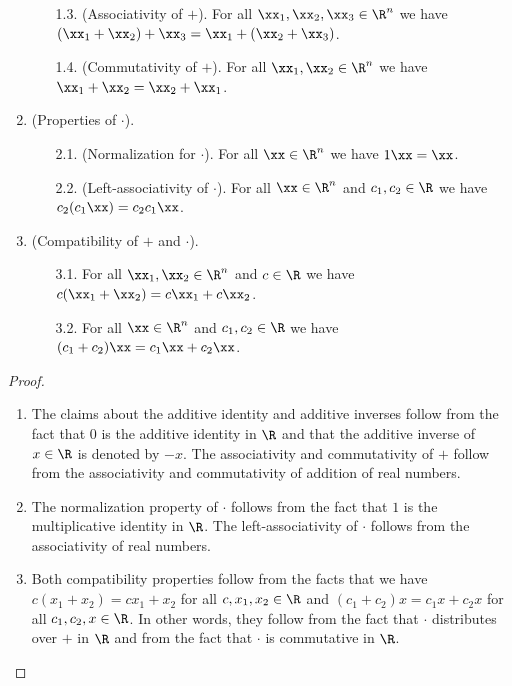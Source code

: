 \begin{theorem}
\begin{enumerate}
\begin{enumerate}
                \item[1.3.] (Associativity of $+$). For all $\xx_1, \xx_2, \xx_3 \in \R^n$ we have $(\xx_1 + \xx_2) + \xx_3 = \xx_1 + (\xx_2 + \xx_3)$.
                \item[1.4.] (Commutativity of $+$). For all $\xx_1, \xx_2 \in \R^n$ we have $\xx_1 + \xx_2 = \xx_2 + \xx_1$.
            \end{enumerate}
            \item (Properties of $\cdot$).
            \begin{enumerate}
                \item[2.1.] (Normalization for $\cdot$). For all $\xx \in \R^n$ we have $1 \xx = \xx$.
                \item[2.2.] (Left-associativity of $\cdot$). For all $\xx \in \R^n$ and $c_1, c_2 \in \R$ we have $c_2 (c_1 \xx) = c_2 c_1 \xx$.
            \end{enumerate}
            \item (Compatibility of $+$ and $\cdot$).
            \begin{enumerate}
                \item[3.1.] For all $\xx_1, \xx_2 \in \R^n$ and $c \in \R$ we have $c(\xx_1 + \xx_2) = c \xx_1 + c \xx_2$.
                \item[3.2.] For all $\xx \in \R^n$ and $c_1, c_2 \in \R$ we have $(c_1 + c_2)\xx = c_1 \xx + c_2 \xx$.
            \end{enumerate}
        \end{enumerate}
\end{theorem}

\begin{proof}
    \mbox{} \\
    \begin{enumerate}
        \item The claims about the additive identity and additive inverses follow from the fact that $0$ is the additive identity in $\R$ and that the additive inverse of $x \in \R$ is denoted by $-x$. The associativity and commutativity of $+$ follow from the associativity and commutativity of addition of real numbers.
        \item The normalization property of $\cdot$ follows from the fact that $1$ is the multiplicative identity in $\R$. The left-associativity of $\cdot$ follows from the associativity of real numbers.
        \item Both compatibility properties follow from the facts that we have $c (x_1 + x_2) = c x_1 + x_2$ for all $c, x_1, x_2 \in \R$ and $(c_1 + c_2) x = c_1 x + c_2 x$ for all $c_1, c_2, x \in \R$. In other words, they follow from the fact that $\cdot$ distributes over $+$ in $\R$ and from the fact that $\cdot$ is commutative in $\R$.
    \end{enumerate} 
\end{proof}

